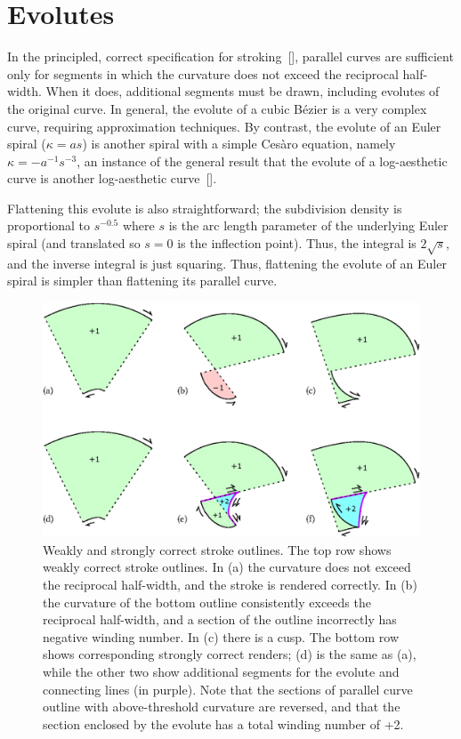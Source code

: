 \documentclass[sigconf, nonacm]{acmart}
\begin{document}
\section{Evolutes}

In the principled, correct specification for stroking~[], parallel curves are sufficient only for segments in which the curvature does not exceed the reciprocal half-width. When it does, additional segments must be drawn, including evolutes of the original curve. In general, the evolute of a cubic Bézier is a very complex curve, requiring approximation techniques. By contrast, the evolute of an Euler spiral ($\kappa = as$) is another spiral with a simple Cesàro equation, namely $\kappa = -a^{-1}s^{-3}$, an instance of the general result that the evolute of a log-aesthetic curve is another log-aesthetic curve~[].

Flattening this evolute is also straightforward; the subdivision density is proportional to $s^{-0.5}$ where $s$ is the arc length parameter of the underlying Euler spiral (and translated so $s = 0$ is the inflection point). Thus, the integral is $2\sqrt{s}$, and the inverse integral is just squaring. Thus, flattening the evolute of an Euler spiral is simpler than flattening its parallel curve.

\begin{figure}
    \includegraphics[scale=0.6]{evolute_fig}
    \caption{Weakly and strongly correct stroke outlines. The top row shows weakly correct stroke outlines. In (a) the curvature does not exceed the reciprocal half-width, and the stroke is rendered correctly. In (b) the curvature of the bottom outline consistently exceeds the reciprocal half-width, and a section of the outline incorrectly has negative winding number. In (c) there is a cusp. The bottom row shows corresponding strongly correct renders; (d) is the same as (a), while the other two show additional segments for the evolute and connecting lines (in purple). Note that the sections of parallel curve outline with above-threshold curvature are reversed, and that the section enclosed by the evolute has a total winding number of +2.}
    \label{fig:evolutes}
\end{figure}
\end{document}
